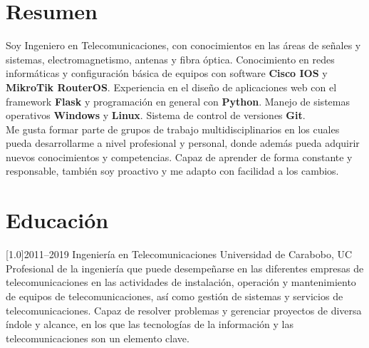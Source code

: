 \documentclass[espanol]{cv-style}     %
\begin{document}
\section{Resumen}
  \vspace{-0.2cm}
Soy Ingeniero en Telecomunicaciones, con conocimientos en las áreas de señales y sistemas, electromagnetismo, antenas y fibra óptica. Conocimiento en redes informáticas y configuración básica de equipos con software \textbf{Cisco IOS} y \textbf{MikroTik RouterOS}. Experiencia en el diseño de aplicaciones web con el framework \textbf{Flask} y programación en general con \textbf{Python}. Manejo de sistemas operativos \textbf{Windows} y \textbf{Linux}. Sistema de control de versiones \textbf{Git}.\\

Me gusta formar parte de grupos de trabajo multidisciplinarios en los cuales pueda desarrollarme a nivel profesional y personal, donde además pueda adquirir nuevos conocimientos y competencias. Capaz de aprender de forma constante y responsable, también soy proactivo y me adapto con facilidad a los cambios.
\section{Educación}
  \vspace{-0.2cm}
\begin{entrylist}
\entry
{\scalebox{.8}[1.0]{2011--2019}}
{Ingeniería en Telecomunicaciones}
{Universidad de Carabobo, UC}
{\textbf{}
\\
\small{Profesional de la ingeniería que puede desempeñarse en las diferentes empresas de telecomunicaciones en las actividades de instalación, operación y mantenimiento de equipos de telecomunicaciones, así como gestión de sistemas y servicios de telecomunicaciones. Capaz de resolver problemas y gerenciar proyectos de diversa índole y alcance, en los que las tecnologías de la información y las telecomunicaciones son un elemento clave.}}
\end{entrylist}
\end{document}
